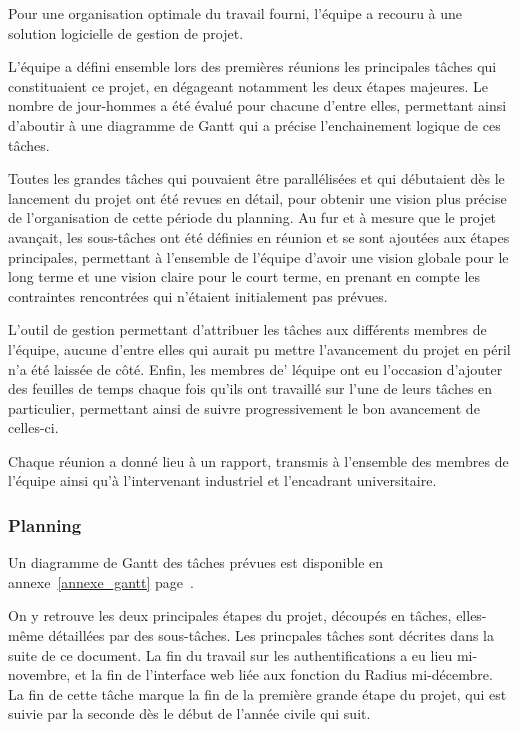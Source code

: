 Pour une organisation optimale du travail fourni, l'équipe a recouru à une solution logicielle de gestion de projet.

L'équipe a défini ensemble lors des premières réunions les principales tâches qui constituaient ce projet, en dégageant notamment les deux étapes majeures. Le nombre de jour-hommes a été évalué pour chacune d'entre elles, permettant ainsi d'aboutir à une diagramme de Gantt qui a précise l'enchainement logique de ces tâches.

Toutes les grandes tâches qui pouvaient être parallélisées et qui débutaient dès le lancement du projet ont été revues en détail, pour obtenir une vision plus précise de l'organisation de cette période du planning. Au fur et à mesure que le projet avançait, les sous-tâches ont été définies en réunion et se sont ajoutées aux étapes principales, permettant à l'ensemble de l'équipe d'avoir une vision globale pour le long terme et une vision claire pour le court terme, en prenant en compte les contraintes rencontrées qui n'étaient initialement pas prévues.

L'outil de gestion permettant d'attribuer les tâches aux différents membres de l'équipe, aucune d'entre elles qui aurait pu mettre l'avancement du projet en péril n'a été laissée de côté. Enfin, les membres de' léquipe ont eu l'occasion d'ajouter des feuilles de temps chaque fois qu'ils ont travaillé sur l'une de leurs tâches en particulier, permettant ainsi de suivre progressivement le bon avancement de celles-ci.

Chaque réunion a donné lieu à un rapport, transmis à l'ensemble des membres de l'équipe ainsi qu'à l'intervenant industriel et l'encadrant universitaire.

\subsubsection{Planning}

Un diagramme de Gantt des tâches prévues est disponible en annexe~\ref{annexe_gantt} page~\pageref{annexe_gantt}.

On y retrouve les deux principales étapes du projet, découpés en tâches, elles-même détaillées par des sous-tâches. Les princpales tâches sont décrites dans la suite de ce document. La fin du travail sur les authentifications a eu lieu mi-novembre, et la fin de l'interface web liée aux fonction du Radius mi-décembre. La fin de cette tâche marque la fin de la première grande étape du projet, qui est suivie par la seconde dès le début de l'année civile qui suit.

